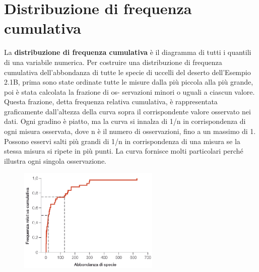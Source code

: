 \documentclass[10pt, draft]{book}
\begin{document}
\section{Distribuzione di frequenza cumulativa}
La \textbf{distribuzione di frequenza cumulativa} è il diagramma di tutti i quantili di una variabile numerica. Per costruire una distribuzione di frequenza cumulativa dell'abbondanza di tutte le specie di uccelli del deserto dell'Esempio 2.1B, prima sono state ordinate tutte le misure dalla più piccola alla più grande, poi è stata calcolata la frazione di os- servazioni minori o uguali a ciascun valore. Questa frazione, detta frequenza relativa cumulativa, è rappresentata graficamente dall'altezza della curva sopra il corrispondente valore osservato nei dati. Ogni gradino è piatto, ma la curva si innalza di 1/n in corrispondenza di ogni misura osservata, dove n è il numero di osservazioni, fino a un massimo di 1. Possono esservi salti più grandi di 1/n in corrispondenza di una misura se la stessa misura si ripete in più punti. La curva fornisce molti particolari perché illustra ogni singola osservazione.
\clearpage
    \begin{figure}[h]\label{fig2.2-1}
    \centering
    \includegraphics[width=0.6\textwidth]{fig2.2-1}
    \caption{\small{}}
    \end{figure}
\end{document}
